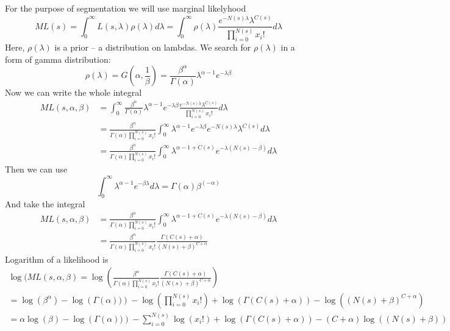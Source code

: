 \documentclass{article}
\begin{document}
For the purpose of segmentation we will use marginal likelyhood
$$
    ML(s) = \int _{0} ^{\infty} L(s, \lambda) \rho(\lambda) d\lambda = 
 \int _{0} ^{\infty} \rho(\lambda) \frac {e^{-N(s)\lambda} \lambda^{C(s)}} {\prod _{i=0} ^{N(s)} x_i!} d\lambda
$$
Here, $\rho(\lambda)$ is a prior -- a distribution on lambdas.
We search for $\rho(\lambda)$ in a form of gamma distribution:
$$
 \rho(\lambda) = G(\alpha, \frac 1 \beta) = \frac {\beta^\alpha} {\Gamma(\alpha)} \lambda^{\alpha-1} e^{-\lambda \beta}
$$
Now we can write the whole integral
\begin{align*}
    ML(s, \alpha, \beta) & = 
 \int _{0} ^{\infty} \frac {\beta^\alpha} {\Gamma(\alpha)} \lambda^{\alpha-1} e^{-\lambda \beta} \frac {e^{-N(s)\lambda} \lambda^{C(s)}} {\prod _{i=0} ^{N(s)} x_i!} d\lambda \\
     & = 
  \frac {\beta^\alpha} {\Gamma(\alpha) \prod _{i=0} ^{N(s)} x_i!} \int _{0} ^{\infty} \lambda^{\alpha-1} e^{-\lambda \beta} {e^{-N(s)\lambda} \lambda^{C(s)}} d\lambda\\
     & = 
    \frac {\beta^\alpha} {\Gamma(\alpha) \prod _{i=0} ^{N(s)} x_i!} \int _{0} ^{\infty} \lambda^{\alpha-1+C(s)}  {e^{-\lambda(N(s)-\beta)} } d\lambda
\end{align*}
Then we can use
$$
\int _0 ^{\infty}  \lambda^{\alpha-1} e^{-\beta\lambda}d\lambda = \Gamma(\alpha) \beta^{(-\alpha)}
$$
And take the integral
\begin{align*}
    ML(s, \alpha, \beta) & = 
    \frac {\beta^\alpha} {\Gamma(\alpha) \prod _{i=0} ^{N(s)} x_i!} \int _{0} ^{\infty} \lambda^{\alpha-1+C(s)}  {e^{-\lambda(N(s)-\beta)} } d\lambda \\
    & = 
    \frac {\beta^\alpha} {\Gamma(\alpha) \prod _{i=0} ^{N(s)} x_i!} \frac {\Gamma(C(s)+\alpha)} {(N(s)+\beta)^{C+\alpha}} 
\end{align*}
Logarithm of a likelihood is
\begin{align*}
    \log (ML(s, \alpha, \beta) = 
    \log \left( \frac {\beta^\alpha} {\Gamma(\alpha) \prod _{i=0} ^{N(s)} x_i!} \frac {\Gamma(C(s)+\alpha)} {(N(s)+\beta)^{C+\alpha}} \right)\\
    =
    \log \left( \beta^\alpha \right) - \log \left( \Gamma(\alpha)) \right) -\log \left( \prod _{i=0} ^{N(s)} x_i! \right) + \log \left( \Gamma(C(s)+\alpha)  \right) -
    \log \left( (N(s)+\beta)^{C+\alpha}\right)\\
    =
    \alpha \log \left( \beta \right) - \log \left( \Gamma(\alpha)) \right) -\sum _{i=0} ^{N(s)} \log \left( x_i! \right) + \log \left( \Gamma(C(s)+\alpha)  \right) -
    (C+\alpha)\log \left( (N(s)+\beta)\right)\\
\end{align*}
\end{document}

